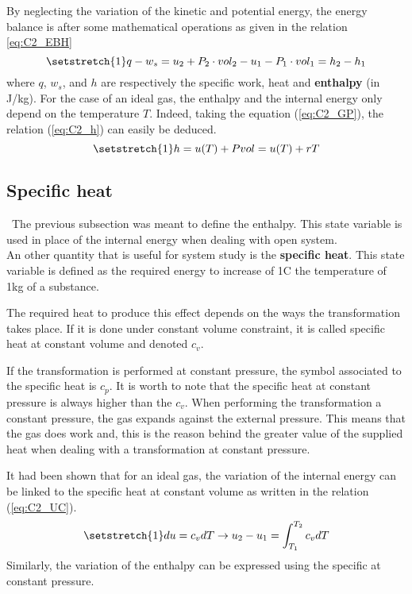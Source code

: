 By neglecting the variation of the kinetic and potential energy, the energy balance is after some mathematical operations as given in the relation \ref{eq:C2_EBH}
\begin{equation}
\setstretch{1}
q - w_s = u_2 +P_2\cdot vol_2 - u_1 - P_1\cdot vol_1 = h_2 - h_1\label{eq:C2_EBH}
\end{equation}
where $q$, $w_s$, and $h$ are respectively the specific work, heat and \textbf{enthalpy} (in J/kg).  
For the case of an ideal gas, the enthalpy and the internal energy only depend on the temperature $T$. Indeed, taking the equation (\ref{eq:C2_GP}), the relation (\ref{eq:C2_h}) can easily be deduced.
\begin{equation}
\setstretch{1}
h = u(T) + Pvol = u(T) + rT \label{eq:C2_h}
\end{equation}
\subsection{Specific heat}
\quad\, The previous subsection was meant to define the enthalpy. This state variable is used in place of the internal energy when dealing with open system.\\

An other quantity that is useful for system study is the \textbf{specific heat}. This state variable is defined as the required energy to increase of 1\degree C the temperature of 1kg of a substance. 
 
The required heat to produce this effect depends on the ways the transformation takes place. 
If it is done under constant volume constraint, it is called specific heat at constant volume and denoted $c_v$. 

If the transformation is performed at constant pressure, the symbol associated to the specific heat is $c_p$.
It is worth to note that the specific heat at constant pressure is always higher than the $c_v$. When performing the transformation a constant pressure, the gas expands against the external pressure. This means that the gas does work and, this is the reason behind the greater value of the supplied heat when dealing with a transformation at constant pressure. 

It had been shown that for an ideal gas, the variation of the internal energy can be linked to the specific heat at constant volume as written in the relation (\ref{eq:C2_UC}).
\begin{equation}
\setstretch{1}
du = c_vdT \rightarrow u_2 - u_1 = \int_{T_1}^{T_2} c_vdT\label{eq:C2_UC}
\end{equation} 
Similarly, the variation of the enthalpy can be expressed using the specific at constant pressure.

